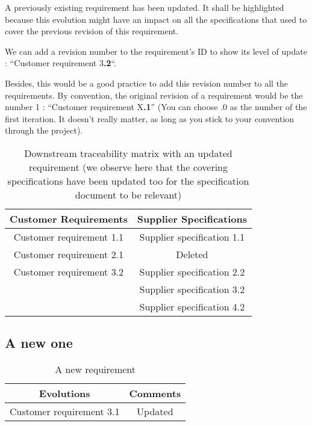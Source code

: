 A previously existing requirement has been updated. It shall be highlighted because this evolution might have an impact on all the specifications that used to cover the previous revision of this requirement.

We can add a revision number to the requirement’s ID to show its level of update : “Customer requirement 3\textbf{.2}“.

Besides, this would be a good practice to add this revision number to all the requirements. By convention, the original revision of a requirement would be the number 1 : “Customer requirement X\textbf{.1}” (You can choose .0 as the number of the first iteration. It doesn’t really matter, as long as you stick to your convention through the project).

\begin{table*}
	\centering
		\begin{tabular}{|c|c|}
			\hline
			\textbf{Customer Requirements} & \textbf{Supplier Specifications}\\
            \hline
            Customer requirement 1.1 & Supplier specification 1.1\\
            \hline
            Customer requirement 2.1 & Deleted\\
            \hline
            Customer requirement 3.2 & Supplier specification 2.2\\
            &Supplier specification 3.2\\
            &Supplier specification 4.2\\
            \hline
		\end{tabular}
	\caption{Downstream traceability matrix with an updated requirement (we observe here that the covering specifications have been updated too for the specification document to be relevant)}
	\label{tab:DownstreamTraceabilityMatrixWithUpdatedReq}
\end{table*}

\subsection{A new one}

\begin{table*}
	\centering
		\begin{tabular}{|c|c|}
			\hline
			\textbf{Evolutions} & \textbf{Comments}\\
            \hline
            Customer requirement 3.1 & Updated\\
            \hline
		\end{tabular}
	\caption{A new requirement}
	\label{tab:New}
\end{table*}

